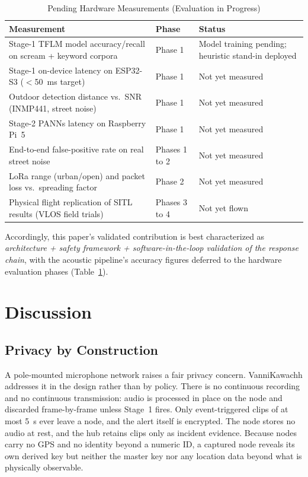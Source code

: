 \documentclass[journal]{IEEEtran}
\begin{document}
\begin{table}[!t]
\caption{Pending Hardware Measurements (Evaluation in Progress)}
\label{tab:pending}
\centering
\small
\begin{tabular}{@{}p{3.4cm}lp{2.5cm}@{}}
\toprule
Measurement & Phase & Status \\
\midrule
Stage-1 TFLM model accuracy/recall on scream + keyword corpora & Phase 1 &
Model training pending; heuristic stand-in deployed \\
Stage-1 on-device latency on ESP32-S3 ($<$50~ms target) & Phase 1 & Not yet
measured \\
Outdoor detection distance vs.\ SNR (INMP441, street noise) & Phase 1 & Not
yet measured \\
Stage-2 PANNs latency on Raspberry Pi~5 & Phase 1 & Not yet measured \\
End-to-end false-positive rate on real street noise & Phases 1 to 2 & Not yet
measured \\
LoRa range (urban/open) and packet loss vs.\ spreading factor & Phase 2 &
Not yet measured \\
Physical flight replication of SITL results (VLOS field trials) & Phases
3 to 4 & Not yet flown \\
\bottomrule
\end{tabular}
\end{table}

Accordingly, this paper's validated contribution is best characterized as
\emph{architecture + safety framework + software-in-the-loop validation of
the response chain}, with the acoustic pipeline's accuracy figures deferred
to the hardware evaluation phases (Table~\ref{tab:pending}).

\section{Discussion}
\label{sec:discussion}

\subsection{Privacy by Construction}

A pole-mounted microphone network raises a fair privacy concern.
VanniKawachh addresses it in the design rather than by policy. There is no
continuous recording and no continuous transmission: audio is processed in
place on the node and discarded frame-by-frame unless Stage~1 fires. Only
event-triggered clips of at most 5~s ever leave a node, and the alert itself
is encrypted. The node stores no audio at rest, and the hub retains clips
only as incident evidence. Because nodes carry no GPS and no identity beyond
a numeric ID, a captured node reveals its own derived key but neither the
master key nor any location data beyond what is physically observable.
\end{document}
